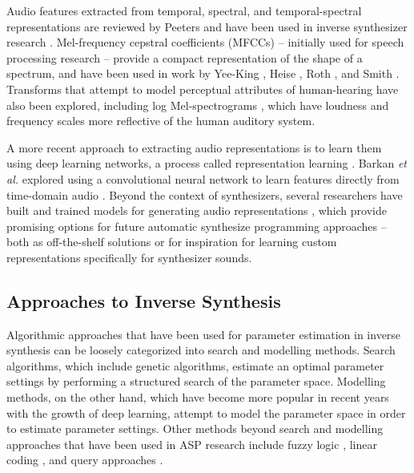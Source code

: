 Audio features extracted from temporal, spectral, and temporal-spectral representations are reviewed by Peeters \cite{peeters2004large} and have been used in inverse synthesizer research \cite{mintz2007toward, stowell2010making, mcartwright2014, blancas2014sound}. Mel-frequency cepstral coefficients (MFCCs) -- initially used for speech processing research -- provide a compact representation of the shape of a spectrum, and have been used in work by Yee-King \cite{yee2008synthbot}, Heise \cite{ heise2009automatic}, Roth \cite{roth2011comparison}, and Smith \cite{smith2017play}. Transforms that attempt to model perceptual attributes of human-hearing have also been explored, including log Mel-spectrograms \cite{zhang2018visualization}, which have loudness and frequency scales more reflective of the human auditory system.

A more recent approach to extracting audio representations is to learn them using deep learning networks, a process called representation learning  \cite{bengio2013representation}. Barkan \textit{et al.} explored using a convolutional neural network to learn features directly from time-domain audio \cite{barkan2019inversynth}. Beyond the context of synthesizers, several researchers have built and trained models for generating audio representations \cite{cramer:learnmore:icassp:19, drossos:icml:2020, engel2017neural}, which provide promising options for future automatic synthesize programming approaches -- both as off-the-shelf solutions or for inspiration for learning custom representations specifically for synthesizer sounds.

\subsection{Approaches to Inverse Synthesis}
Algorithmic approaches that have been used for parameter estimation in inverse synthesis can be loosely categorized into search and modelling methods. Search algorithms, which include genetic algorithms, estimate an optimal parameter settings by performing a structured search of the parameter space. Modelling methods, on the other hand, which have become more popular in recent years with the growth of deep learning, attempt to model the parameter space in order to estimate parameter settings. Other methods beyond search and modelling approaches that have been used in ASP research include fuzzy logic \cite{mitchell2005frequency, hamadicharef2012intelligent}, linear coding \cite{mintz2007toward}, and query approaches \cite{mcartwright2014}.

